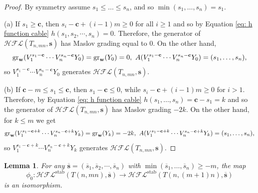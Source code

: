 \documentclass{amsart}
\newtheorem{lemma}[theorem]{Lemma}
\newcommand{\cHFL}{\mathcal{H\!F\! L}}
\newcommand{\ovl}{\overline}
\newcommand{\w}{\mathbf{w}}
\def\gr{\textup{gr}}
\def\w{{\bf{w}}}
\newcommand{\A}{\mathfrak{A}}
\newcommand{\cc}{\mathbf{c}}
\newcommand{\stab}{\mathrm{stab}}
\renewcommand{\ss}{\mathbf{s}}
\begin{document}
\begin{proof}
By symmetry assume $s_1\le \ldots\le s_n$, and so $\min(s_1,\ldots,s_n)=s_1$. 

(a) If $s_1\ge \cc$, then $s_i-\cc+(i-1)m\ge 0$ for all $i\geq 1$ and so by Equation \eqref{eq: h function cable} $h(s_1,s_2,\cdots,s_n)=0$. Therefore, the generator of $\cHFL(T_{n,mn},\ss)$ has Maslov grading equal to $0$. On the other hand, $$
\gr_{\w}(V^{s_1-\cc}_1\cdots V^{s_n-\cc}_nY_0)=\gr_{\w}(Y_0)=0,\ A(V^{s_1-\cc}_1\cdots V^{s_n-\cc}_nY_0)=(s_1,\ldots,s_n),
$$
 so
$V^{s_1-\cc}_1\cdots V^{s_n-\cc}_nY_0$ generates $\cHFL(T_{n,mn},\ss)$.





(b) If $\cc-m\le s_1\le \cc$, then $s_1-\cc\le 0$, while $s_i-\cc+(i-1)m\ge 0$ for $i>1$. Therefore, by Equation \eqref{eq: h function cable} $h(s_1,\ldots,s_n)=\cc-s_1=k$ and so the generator of $\cHFL(T_{n,mn},\ss)$ has Maslov grading $-2k$.
On the other hand, for $k\le m$ we get  
$$
\gr_{\w}(V^{s_1-\cc+k}_1\cdots V^{s_n-\cc+k}_nY_k)=\gr_{\w}(Y_k)=-2k,\ A(V^{s_1-\cc+k}_1\cdots V^{s_n-\cc+k}_nY_k)=(s_1,\ldots,s_n),
$$
so $V^{s_1-\cc+k}_1\cdots V^{s_n-\cc+k}_nY_k$ generates $\cHFL(T_{n,mn},\ss)$.
\end{proof}


\begin{lemma}
\label{lem: stable range iso} For any $\overline{\ss}=(\ovl{s}_1,\ovl{s}_2,\cdots,\ovl{s}_n)$ with $\min(\ovl{s}_1,\ldots,\ovl{s}_n)\ge -m$, the map
$$\phi_0: \cHFL^{\stab}\left(T(n,mn),\ovl{\ss}\right)\to \cHFL^{\stab}\left(T(n,(m+1)n),\ovl{\ss}\right)
$$ 
is an isomorphism.
\end{lemma}
\end{document}
